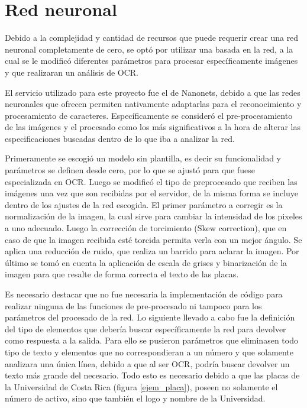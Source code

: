 \section{Red neuronal}
Debido a la complejidad y cantidad de recursos que puede requerir crear una red neuronal completamente de cero, se optó por utilizar una basada en la red, a la cual se le modificó diferentes parámetros para procesar específicamente imágenes y que realizaran un análisis de OCR. 
\par
El servicio utilizado para este proyecto fue el de Nanonets, debido a que las redes neuronales que ofrecen permiten nativamente adaptarlas para el reconocimiento y procesamiento de caracteres. Específicamente se consideró el pre-procesamiento de las imágenes y el procesado como los más significativos a la hora de alterar las especificaciones buscadas dentro de lo que iba a analizar la red.
\par
Primeramente se escogió un modelo sin plantilla, es decir su funcionalidad y parámetros se definen desde cero, por lo que se ajustó para que fuese especializada en OCR. Luego se modificó el tipo de preprocesado que reciben las imágenes una vez que son recibidas por el servidor, de la misma forma se incluye dentro de los ajustes de la red escogida. El primer parámetro a corregir es la normalización de la imagen, la cual sirve para cambiar la intensidad de los pixeles a uno adecuado. Luego la corrección de torcimiento (Skew correction), que en caso de que la imagen recibida esté torcida permita verla con un mejor ángulo. Se aplica una reducción de ruido, que realiza un barrido para aclarar la imagen. Por último se tomó en cuenta la aplicación de escala de grises y binarización de la imagen para que resalte de forma correcta el texto de las placas.
\par
Es necesario destacar que no fue necesaria la implementación de código para realizar ninguna de las funciones de pre-procesado ni tampoco para los parámetros del procesado de la red. Lo siguiente llevado a cabo fue la definición del tipo de elementos que debería buscar específicamente la red para devolver como respuesta a la salida. Para ello se pusieron parámetros que eliminasen todo tipo de texto y elementos que no correspondieran a un número y que solamente analizara una única línea, debido a que al ser OCR, podría buscar devolver un texto más grande del necesario. Todo esto es necesario debido a que las placas de la Universidad de Costa Rica (figura \ref{ejem_placa}), poseen no solamente el número de activo, sino que también el logo y nombre de la Universidad.

